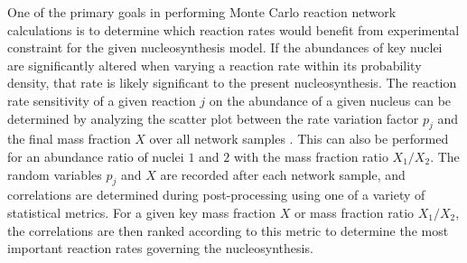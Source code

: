 One of the primary goals in performing Monte Carlo reaction network calculations is to determine which reaction rates would benefit from experimental constraint for the given nucleosynthesis model. If the abundances of key nuclei are significantly altered when varying a reaction rate within its probability density, that rate is likely significant to the present nucleosynthesis.
The reaction rate sensitivity of a given reaction $j$ on the abundance of a given nucleus can be determined by analyzing the scatter plot between the rate variation factor $p_{j}$ and the final mass fraction $X$ over all network samples \cite{Iliadis2015b}. This can also be performed for an abundance ratio of nuclei $1$ and $2$ with the mass fraction ratio $X_{1}/X_{2}$. The random variables $p_{j}$ and $X$ are recorded after each network sample, and correlations are determined during post-processing using one of a variety of statistical metrics. For a given key mass fraction $X$ or mass fraction ratio $X_{1}/X_{2}$, the correlations are then ranked according to this metric to determine the most important reaction rates governing the nucleosynthesis.

